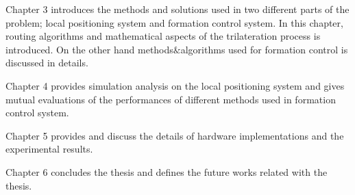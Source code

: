 Chapter 3 introduces the methods and solutions used in two different parts of the problem; local positioning system and formation control system. In this chapter, routing algorithms and mathematical aspects of the trilateration process is introduced. On the other hand methods$\&$algorithms used for formation control is discussed in details.

Chapter 4 provides simulation analysis on the local positioning system and gives mutual evaluations of the performances of different methods used in formation control system.

Chapter 5 provides and discuss the details of hardware implementations and the experimental results.

Chapter 6 concludes the thesis and defines the future works related with the thesis.